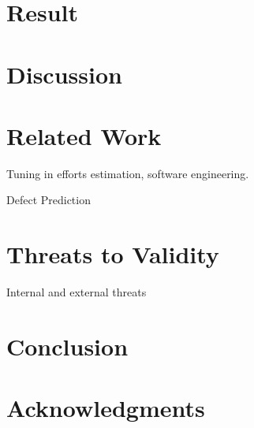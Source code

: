 \documentclass{sig-alternative}
\begin{document}
\section{Result}

\section{Discussion}

\section{Related Work}

Tuning in efforts estimation, software engineering.

Defect Prediction



\section{Threats to Validity}

Internal and external threats

\section{Conclusion}

\section{Acknowledgments}


  
\end{document}
